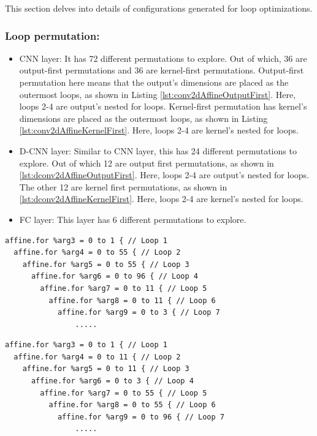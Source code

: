 This section delves into details of configurations generated for loop optimizations.

\subsubsection{Loop permutation:}

\begin{itemize}
    \item CNN layer: It has 72 different permutations to explore. Out of which, 36 are output-first permutations and 36 are kernel-first permutations. Output-first permutation here means that the output's dimensions are placed as the outermost loops, as shown in Listing \ref{lst:conv2dAffineOutputFirst}. Here, loops 2-4 are output's nested for loops. Kernel-first permutation has kernel's dimensions are placed as the outermost loops, as shown in Listing \ref{lst:conv2dAffineKernelFirst}. Here, loops 2-4 are kernel's nested for loops.
    \item D-CNN layer: Similar to CNN layer, this has 24 different permutations to explore. Out of which 12 are output first permutations, as shown in \ref{lst:dconv2dAffineOutputFirst}. Here, loops 2-4 are output's nested for loops. The other 12 are kernel first permutations, as shown in \ref{lst:dconv2dAffineKernelFirst}. Here, loops 2-4 are kernel's nested for loops.
    \item FC layer: This layer has 6 different permutations to explore.
\end{itemize}

\begin{lstlisting}[caption={Example conv2d with output-first permutation}, label={lst:conv2dAffineOutputFirst}]
affine.for %arg3 = 0 to 1 { // Loop 1
  affine.for %arg4 = 0 to 55 { // Loop 2
    affine.for %arg5 = 0 to 55 { // Loop 3
      affine.for %arg6 = 0 to 96 { // Loop 4
        affine.for %arg7 = 0 to 11 { // Loop 5
          affine.for %arg8 = 0 to 11 { // Loop 6
            affine.for %arg9 = 0 to 3 { // Loop 7
                .....
\end{lstlisting}
\begin{lstlisting}[caption={Example conv2d with kernel-first permutation}, label={lst:conv2dAffineKernelFirst}]
affine.for %arg3 = 0 to 1 { // Loop 1
  affine.for %arg4 = 0 to 11 { // Loop 2
    affine.for %arg5 = 0 to 11 { // Loop 3
      affine.for %arg6 = 0 to 3 { // Loop 4
        affine.for %arg7 = 0 to 55 { // Loop 5
          affine.for %arg8 = 0 to 55 { // Loop 6
            affine.for %arg9 = 0 to 96 { // Loop 7
                .....
\end{lstlisting}

